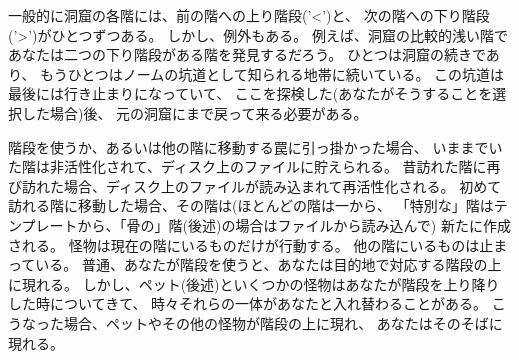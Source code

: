 一般的に洞窟の各階には、前の階への上り階段('<')と、
次の階への下り階段('>')がひとつずつある。
しかし、例外もある。
例えば、洞窟の比較的浅い階であなたは二つの下り階段がある階を発見するだろう。
ひとつは洞窟の続きであり、
もうひとつはノームの坑道として知られる地帯に続いている。
この坑道は最後には行き止まりになっていて、
ここを探検した(あなたがそうすることを選択した場合)後、
元の洞窟にまで戻って来る必要がある。

%
階段を使うか、あるいは他の階に移動する罠に引っ掛かった場合、
いままでいた階は非活性化されて、ディスク上のファイルに貯えられる。
昔訪れた階に再び訪れた場合、ディスク上のファイルが読み込まれて再活性化される。
初めて訪れる階に移動した場合、その階は(ほとんどの階は一から、
「特別な」階はテンプレートから、「骨の」階(後述)の場合はファイルから読み込んで)
新たに作成される。
怪物は現在の階にいるものだけが行動する。
他の階にいるものは止まっている。
普通、あなたが階段を使うと、あなたは目的地で対応する階段の上に現れる。
しかし、ペット(後述)といくつかの怪物はあなたが階段を上り降りした時についてきて、
時々それらの一体があなたと入れ替わることがある。
こうなった場合、ペットやその他の怪物が階段の上に現れ、
あなたはそのそばに現れる。

